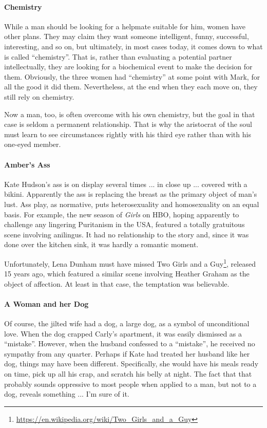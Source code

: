 \paragraph{Chemistry}


While a man should be looking for a helpmate suitable for him, women have other plans. They may claim they want someone intelligent, funny, successful, interesting, and so on, but ultimately, in most cases today, it comes down to what is called ``chemistry''. That is, rather than evaluating a potential partner intellectually, they are looking for a biochemical event to make the decision for them. Obviously, the three women had ``chemistry'' at some point with Mark, for all the good it did them. Nevertheless, at the end when they each move on, they still rely on chemistry.

Now a man, too, is often overcome with his own chemistry, but the goal in that case is seldom a permanent relationship. That is why the aristocrat of the soul must learn to see circumstances rightly with his third eye rather than with his one-eyed member.

\paragraph{Amber's Ass}


Kate Hudson's ass is on display several times ... in close up ... covered with a bikini. Apparently the ass is replacing the breast as the primary object of man's lust. Ass play, as normative, puts heterosexuality and homosexuality on an equal basis. For example, the new season of \emph{Girls} on HBO, hoping apparently to challenge any lingering Puritanism in the USA, featured a totally gratuitous scene involving anilingus. It had no relationship to the story and, since it was done over the kitchen sink, it was hardly a romantic moment.

Unfortunately, Lena Dunham must have missed Two Girls and a Guy\footnote{\url{https://en.wikipedia.org/wiki/Two_Girls_and_a_Guy}}, released 15 years ago, which featured a similar scene involving Heather Graham as the object of affection. At least in that case, the temptation was believable.

\paragraph{A Woman and her Dog}


Of course, the jilted wife had a dog, a large dog, as a symbol of unconditional love. When the dog crapped Carly's apartment, it was easily dismissed as a ``mistake''. However, when the husband confessed to a ``mistake'', he received no sympathy from any quarter. Perhaps if Kate had treated her husband like her dog, things may have been different. Specifically, she would have his meals ready on time, pick up all his crap, and scratch his belly at night. The fact that that probably sounds oppressive to most people when applied to a man, but not to a dog, reveals something ... I'm sure of it.

